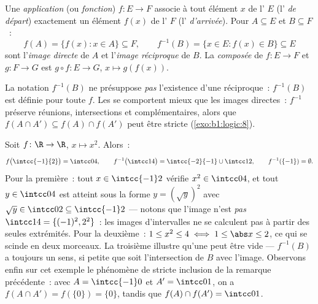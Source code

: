 \begin{definition}\label{def:b1:logic:map}
Une \emph{application} (ou \emph{fonction})
$f \colon E \to F$ associe à tout élément $x$ de l' $E$
(l'\emph{ de départ}) exactement un élément $f(x)$ de
l' $F$ (l'\emph{ d'arrivée}). Pour $A \subseteq E$ et
$B \subseteq F$~:
\[
f(A) = \{f(x) : x \in A\} \subseteq F,
\qquad
f^{-1}(B) = \{x \in E : f(x) \in B\} \subseteq E
\]
sont l'\emph{image directe} de $A$ et l'\emph{image réciproque}
 de $B$. La \emph{composée} de $f \colon E \to
F$ et $g \colon F \to G$ est $g \circ f \colon E \to G$, $x \mapsto
g(f(x))$.
\end{definition}

\begin{remark}
La notation $f^{-1}(B)$ ne présuppose \emph{pas} l'existence d'une
 réciproque~: $f^{-1}(B)$ est définie pour toute $f$. Les
 se comportent mieux que les images directes~:
$f^{-1}$ préserve réunions, intersections et complémentaires, alors que
$f(A \cap A') \subseteq f(A) \cap f(A')$ peut être stricte
(\cref{exo:b1:logic:8}).
\end{remark}

\begin{example}\label{ex:b1:logic:images}
Soit $f \colon \R \to \R$, $x \mapsto x^2$. Alors~:
\[
f\bigl(\intcc{-1}{2}\bigr) = \intcc04, \qquad
f^{-1}\bigl(\intcc14\bigr) = \intcc{-2}{-1} \cup \intcc12, \qquad
f^{-1}(\{-1\}) = \emptyset .
\]
Pour la première~: tout $x \in \intcc{-1}2$ vérifie $x^2 \in \intcc04$,
et tout $y \in \intcc04$ est atteint sous la forme $y = (\sqrt y)^2$
avec $\sqrt y \in \intcc02 \subseteq \intcc{-1}2$ --- notons que l'image
n'est \emph{pas} $\intcc14 = \{(-1)^2, 2^2\}$~: les images d'intervalles
ne se calculent pas à partir des seules extrémités. Pour la deuxième~:
$1 \leq x^2 \leq 4 \iff 1 \leq \abs x \leq 2$, ce qui se scinde en deux
morceaux. La troisième illustre qu'une  peut être vide
--- $f^{-1}(B)$ a toujours un sens, si petite que soit l'intersection de
$B$ avec l'image. Observons enfin sur cet exemple le phénomène de
stricte inclusion de la remarque précédente~: avec $A = \intcc{-1}0$ et
$A' = \intcc01$, on a $f(A \cap A') = f(\{0\}) = \{0\}$, tandis que
$f(A) \cap f(A') = \intcc01$.
\end{example}


